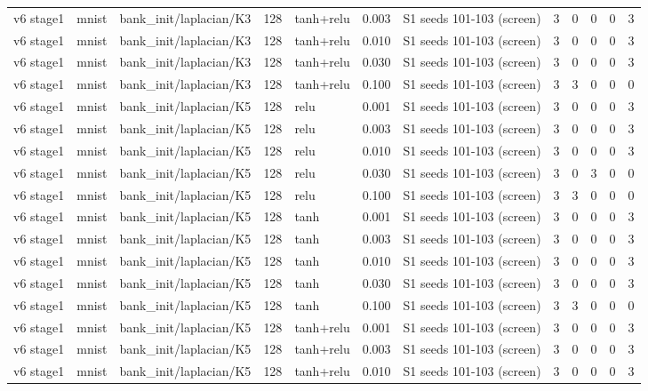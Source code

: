 \begin{table}[htbp]
{\begin{tabular}{@{}lllrlrlrrrrr@{}}
v6 stage1 & mnist & bank\_init/laplacian/K3 & 128 & tanh+relu & 0.003 & S1 seeds 101-103 (screen) & 3 & 0 & 0 & 0 & 3 \\
v6 stage1 & mnist & bank\_init/laplacian/K3 & 128 & tanh+relu & 0.010 & S1 seeds 101-103 (screen) & 3 & 0 & 0 & 0 & 3 \\
v6 stage1 & mnist & bank\_init/laplacian/K3 & 128 & tanh+relu & 0.030 & S1 seeds 101-103 (screen) & 3 & 0 & 0 & 0 & 3 \\
v6 stage1 & mnist & bank\_init/laplacian/K3 & 128 & tanh+relu & 0.100 & S1 seeds 101-103 (screen) & 3 & 3 & 0 & 0 & 0 \\
v6 stage1 & mnist & bank\_init/laplacian/K5 & 128 & relu & 0.001 & S1 seeds 101-103 (screen) & 3 & 0 & 0 & 0 & 3 \\
v6 stage1 & mnist & bank\_init/laplacian/K5 & 128 & relu & 0.003 & S1 seeds 101-103 (screen) & 3 & 0 & 0 & 0 & 3 \\
v6 stage1 & mnist & bank\_init/laplacian/K5 & 128 & relu & 0.010 & S1 seeds 101-103 (screen) & 3 & 0 & 0 & 0 & 3 \\
v6 stage1 & mnist & bank\_init/laplacian/K5 & 128 & relu & 0.030 & S1 seeds 101-103 (screen) & 3 & 0 & 3 & 0 & 0 \\
v6 stage1 & mnist & bank\_init/laplacian/K5 & 128 & relu & 0.100 & S1 seeds 101-103 (screen) & 3 & 3 & 0 & 0 & 0 \\
v6 stage1 & mnist & bank\_init/laplacian/K5 & 128 & tanh & 0.001 & S1 seeds 101-103 (screen) & 3 & 0 & 0 & 0 & 3 \\
v6 stage1 & mnist & bank\_init/laplacian/K5 & 128 & tanh & 0.003 & S1 seeds 101-103 (screen) & 3 & 0 & 0 & 0 & 3 \\
v6 stage1 & mnist & bank\_init/laplacian/K5 & 128 & tanh & 0.010 & S1 seeds 101-103 (screen) & 3 & 0 & 0 & 0 & 3 \\
v6 stage1 & mnist & bank\_init/laplacian/K5 & 128 & tanh & 0.030 & S1 seeds 101-103 (screen) & 3 & 0 & 0 & 0 & 3 \\
v6 stage1 & mnist & bank\_init/laplacian/K5 & 128 & tanh & 0.100 & S1 seeds 101-103 (screen) & 3 & 3 & 0 & 0 & 0 \\
v6 stage1 & mnist & bank\_init/laplacian/K5 & 128 & tanh+relu & 0.001 & S1 seeds 101-103 (screen) & 3 & 0 & 0 & 0 & 3 \\
v6 stage1 & mnist & bank\_init/laplacian/K5 & 128 & tanh+relu & 0.003 & S1 seeds 101-103 (screen) & 3 & 0 & 0 & 0 & 3 \\
v6 stage1 & mnist & bank\_init/laplacian/K5 & 128 & tanh+relu & 0.010 & S1 seeds 101-103 (screen) & 3 & 0 & 0 & 0 & 3 \\

\end{tabular}}
\end{table}
